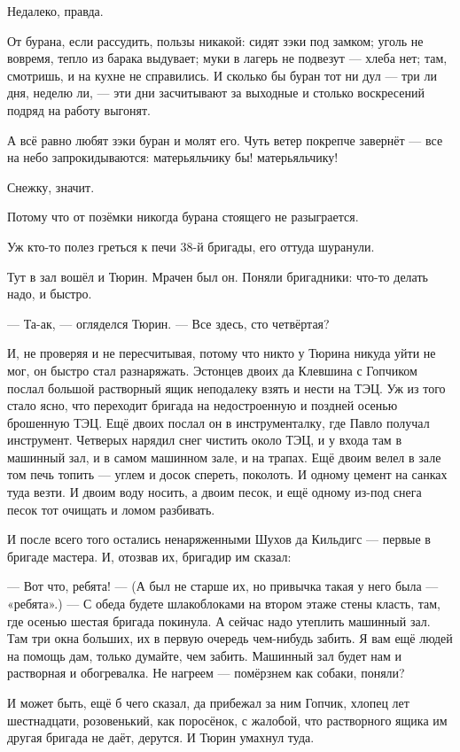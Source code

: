 Недалеко, правда.

От бурана, если рассудить, пользы никакой: сидят зэки под замком; уголь не вовремя, тепло из
барака выдувает; муки в лагерь не подвезут --- хлеба нет; там, смотришь, и на кухне не
справились. И сколько бы буран тот ни дул --- три ли дня, неделю ли, --- эти дни засчитывают за
выходные и столько воскресений подряд на работу выгонят.

А всё равно любят зэки буран и молят его. Чуть ветер покрепче завернёт --- все на небо
запрокидываются: матерьяльчику бы! матерьяльчику!

Снежку, значит.

Потому что от позёмки никогда бурана стоящего не разыграется.

Уж кто-то полез греться к печи 38-й бригады, его оттуда шуранули.

Тут в зал вошёл и Тюрин. Мрачен был он. Поняли бригадники: что-то делать надо, и быстро.

--- Та-ак, --- огляделся Тюрин. --- Все здесь, сто четвёртая?

И, не проверяя и не пересчитывая, потому что никто у Тюрина никуда уйти не мог, он быстро стал
разнаряжать. Эстонцев двоих да Клевшина с Гопчиком послал большой растворный ящик
неподалеку взять и нести на ТЭЦ. Уж из того стало ясно, что переходит бригада на
недостроенную и поздней осенью брошенную ТЭЦ. Ещё двоих послал он в инструменталку, где
Павло получал инструмент. Четверых нарядил снег чистить около ТЭЦ, и у входа там в машинный
зал, и в самом машинном зале, и на трапах. Ещё двоим велел в зале том печь топить --- углем и
досок спереть, поколоть. И одному цемент на санках туда везти. И двоим воду носить, а двоим
песок, и ещё одному из-под снега песок тот очищать и ломом разбивать.

И после всего того остались ненаряженными Шухов да Кильдигс --- первые в бригаде мастера. И,
отозвав их, бригадир им сказал:

--- Вот что, ребята! --- (А был не старше их, но привычка такая у него была --- «ребята».) --- С обеда
будете шлакоблоками на втором этаже стены класть, там, где осенью шестая бригада покинула. А
сейчас надо утеплить машинный зал. Там три окна больших, их в первую очередь чем-нибудь
забить. Я вам ещё людей на помощь дам, только думайте, чем забить. Машинный зал будет нам и
растворная и обогревалка. Не нагреем --- помёрзнем как собаки, поняли?

И может быть, ещё б чего сказал, да прибежал за ним Гопчик, хлопец лет шестнадцати,
розовенький, как поросёнок, с жалобой, что растворного ящика им другая бригада не даёт,
дерутся. И Тюрин умахнул туда.

